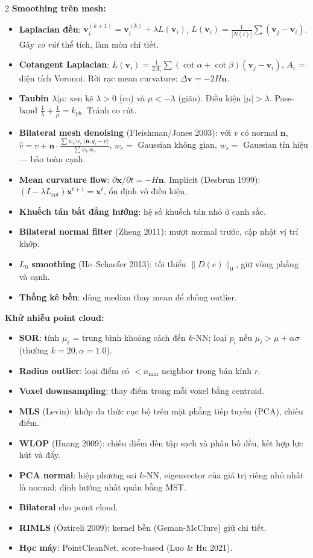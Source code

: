 \begin{paracol}{2}
\textbf{Smoothing trên mesh:}
\begin{itemize}[leftmargin=*,nosep]
  \item \textbf{Laplacian đều}: $\mathbf v_i^{(k+1)} = \mathbf v_i^{(k)}+\lambda L(\mathbf v_i)$, $L(\mathbf v_i)=\tfrac{1}{|N(i)|}\sum(\mathbf v_j-\mathbf v_i)$. Gây \emph{co rút} thể tích, làm mòn chi tiết.
  \item \textbf{Cotangent Laplacian}: $L(\mathbf v_i)=\tfrac{1}{2A_i}\sum(\cot\alpha+\cot\beta)(\mathbf v_j-\mathbf v_i)$, $A_i$ = diện tích Voronoi. Rời rạc mean curvature: $\Delta\mathbf v=-2H\mathbf n$.
  \item \textbf{Taubin $\lambda|\mu$}: xen kẽ $\lambda>0$ (co) và $\mu<-\lambda$ (giãn). Điều kiện $|\mu|>\lambda$. Pass-band $\tfrac1\lambda+\tfrac1\mu=k_{pb}$. Tránh co rút.
  \item \textbf{Bilateral mesh denoising} (Fleishman/Jones 2003): với $v$ có normal $\mathbf n$,
    $\hat v = v + \mathbf n\cdot \tfrac{\sum w_c\,w_s\,\langle\mathbf n,q_i-v\rangle}{\sum w_c\,w_s}$,
    $w_c=$ Gaussian không gian, $w_s=$ Gaussian tín hiệu — bảo toàn cạnh.
  \item \textbf{Mean curvature flow}: $\partial\mathbf x/\partial t = -H\mathbf n$. Implicit (Desbrun 1999): $(I-\lambda L_{cot})\mathbf x^{t+1}=\mathbf x^t$, ổn định vô điều kiện.
  \item \textbf{Khuếch tán bất đẳng hướng}: hệ số khuếch tán nhỏ ở cạnh sắc.
  \item \textbf{Bilateral normal filter} (Zheng 2011): mượt normal trước, cập nhật vị trí khớp.
  \item \textbf{$L_0$ smoothing} (He–Schaefer 2013): tối thiểu $\|D(e)\|_0$, giữ vùng phẳng và cạnh.
  \item \textbf{Thống kê bền}: dùng median thay mean để chống outlier.
\end{itemize}

\textbf{Khử nhiễu point cloud:}
\begin{itemize}[leftmargin=*,nosep]
  \item \textbf{SOR}: tính $\mu_i$ = trung bình khoảng cách đến $k$-NN; loại $p_i$ nếu $\mu_i>\mu+\alpha\sigma$ (thường $k=20,\alpha=1.0$).
  \item \textbf{Radius outlier}: loại điểm có $<n_{\min}$ neighbor trong bán kính $r$.
  \item \textbf{Voxel downsampling}: thay điểm trong mỗi voxel bằng centroid.
  \item \textbf{MLS} (Levin): khớp đa thức cục bộ trên mặt phẳng tiếp tuyến (PCA), chiếu điểm.
  \item \textbf{WLOP} (Huang 2009): chiếu điểm đến tập sạch và phân bố đều, kết hợp lực hút và đẩy.
  \item \textbf{PCA normal}: hiệp phương sai $k$-NN, eigenvector của giá trị riêng nhỏ nhất là normal; định hướng nhất quán bằng MST.
  \item \textbf{Bilateral} cho point cloud.
  \item \textbf{RIMLS} (Öztireli 2009): kernel bền (Geman-McClure) giữ chi tiết.
  \item \textbf{Học máy}: PointCleanNet, score-based (Luo \& Hu 2021).
\end{itemize}


\end{paracol}
